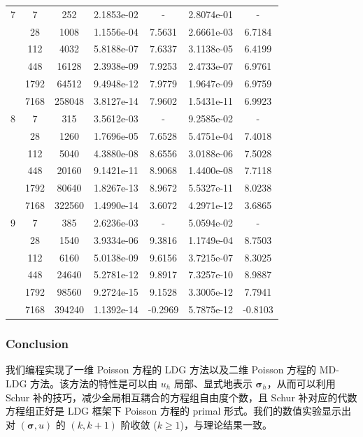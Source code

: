 \begin{longtable}{| c | c c | c c | c c |}
	\hline

	7	& 7 & 252 & 2.1853e-02 & - & 2.8074e-01 & - \\
		& 28 & 1008 & 1.1556e-04 & 7.5631 & 2.6661e-03 & 6.7184 \\
		& 112 & 4032 & 5.8188e-07 & 7.6337 & 3.1138e-05 & 6.4199 \\
		& 448 & 16128 & 2.3938e-09 & 7.9253 & 2.4733e-07 & 6.9761 \\
		& 1792 & 64512 & 9.4948e-12 & 7.9779 & 1.9647e-09 & 6.9759 \\
		& 7168 & 258048 & 3.8127e-14 & 7.9602 & 1.5431e-11 & 6.9923 \\

    \hline

	8	& 7 & 315 & 3.5612e-03 & - & 9.2585e-02 & - \\
		& 28 & 1260 & 1.7696e-05 & 7.6528 & 5.4751e-04 & 7.4018 \\
		& 112 & 5040 & 4.3880e-08 & 8.6556 & 3.0188e-06 & 7.5028 \\
		& 448 & 20160 & 9.1421e-11 & 8.9068 & 1.4400e-08 & 7.7118 \\
		& 1792 & 80640 & 1.8267e-13 & 8.9672 & 5.5327e-11 & 8.0238 \\
		& 7168 & 322560 & 1.4990e-14 & 3.6072 & 4.2971e-12 & 3.6865 \\

    \hline

	9	& 7 & 385 & 2.6236e-03 & - & 5.0594e-02 & - \\
		& 28 & 1540 & 3.9334e-06 & 9.3816 & 1.1749e-04 & 8.7503 \\
		& 112 & 6160 & 5.0138e-09 & 9.6156 & 3.7215e-07 & 8.3025 \\
		& 448 & 24640 & 5.2781e-12 & 9.8917 & 7.3257e-10 & 8.9887 \\
		& 1792 & 98560 & 9.2724e-15 & 9.1528 & 3.3005e-12 & 7.7941 \\
		& 7168 & 394240 & 1.1392e-14 & -0.2969 & 5.7875e-12 & -0.8103 \\
\end{longtable}


\subsubsection{Conclusion}

我们编程实现了一维 Poisson 方程的 LDG 方法以及二维 Poisson 方程的 MD-LDG 方法。该方法的特性是可以由 \(u_{h}\) 局部、显式地表示 \(\bm\sigma_{h}\)，从而可以利用 Schur 补的技巧，减少全局相互耦合的方程组自由度个数，且 Schur 补对应的代数方程组正好是 LDG 框架下 Poisson 方程的 primal 形式。我们的数值实验显示出对 \((\bm\sigma, u)\) 的 \((k, k+1)\) 阶收敛 (\(k \geqslant 1\))，与理论结果一致。




